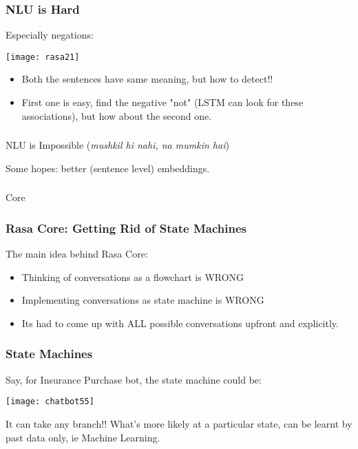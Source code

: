 \begin{frame}[fragile]\frametitle{NLU is Hard}

Especially negations:

\begin{center}
\texttt{[image: rasa21]}
\end{center}

\begin{itemize}
\item Both the sentences have same meaning, but how to detect!!
\item First one is easy, find the negative "not" (LSTM can look for these associations), but how about the second one.
\end{itemize}

\end{frame}

\begin{frame}[fragile]\frametitle{}

NLU is Impossible (\textit{mushkil hi nahi, na mumkin hai})

Some hopes: better (sentence level) embeddings.
\end{frame}

\begin{frame}[fragile]\frametitle{}
\begin{center}
{\Large Core}

\end{center}
\end{frame}

\begin{frame}[fragile]\frametitle{Rasa Core: Getting Rid of State Machines}
The main idea behind Rasa Core: 
\begin{itemize}
\item Thinking of conversations as a flowchart is WRONG
\item Implementing conversations as state machine is WRONG
\item Its had to come up with ALL possible conversations upfront and explicitly.
\end{itemize}

\end{frame}

 \begin{frame}[fragile]\frametitle{State Machines}
Say, for Insurance Purchase bot, the state machine could be:

\begin{center}
\texttt{[image: chatbot55]}

\end{center}

It can take any branch!! What's more likely at a particular state, can be learnt by past data only, ie Machine Learning.
\end{frame}


